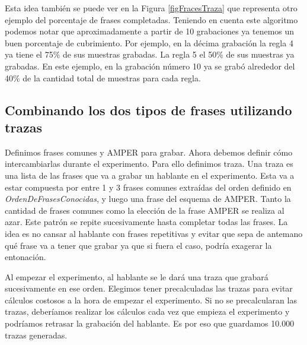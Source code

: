 \normalsize

Esta idea también se puede ver en la Figura \ref{figFracesTraza} que representa otro ejemplo del porcentaje de frases completadas. Teniendo en cuenta este algoritmo podemos notar que aproximadamente a partir de 10 grabaciones ya tenemos un buen porcentaje de cubrimiento. Por ejemplo, en la décima grabación la regla 4 ya tiene el 75\% de sus muestras grabadas. La regla 5 el 50\% de sus muestras ya grabadas. En este ejemplo, en la grabación número 10 ya se grabó alrededor del 40\% de la cantidad total de muestras para cada regla.


\subsection{Combinando los dos tipos de frases utilizando trazas}

Definimos frases comunes y AMPER para grabar. Ahora debemos definir cómo intercambiarlas durante el experimento. Para ello definimos traza. Una traza es una lista de las frases que va a grabar un hablante en el experimento. Esta va a estar compuesta por entre 1 y 3 frases comunes extraídas del orden definido en \textit{OrdenDeFrasesConocidas}, y luego una frase del esquema de AMPER. Tanto la cantidad de frases comunes como la elección de la frase AMPER se realiza al azar. Este patrón se repite sucesivamente hasta completar todas las frases. La idea es no cansar al hablante con frases repetitivas y evitar que sepa de antemano qué frase va a tener que grabar ya que si fuera el caso, podría exagerar la entonación.

Al empezar el experimento, al hablante se le dará una traza que grabará sucesivamente en ese orden. Elegimos tener precalculadas las trazas para evitar cálculos costosos a la hora de empezar el experimento. Si no se precalcularan las trazas, deberíamos realizar los cálculos cada vez que empieza el experimento y podríamos retrasar la grabación del hablante. Es por eso que guardamos 10.000 trazas generadas. 


